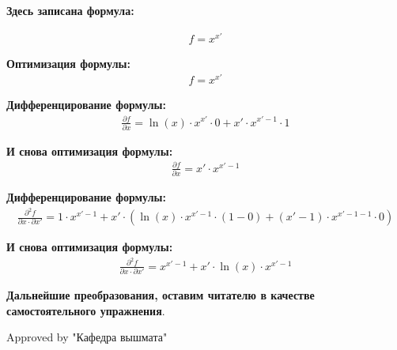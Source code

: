 \documentclass[12pt, a4paper]{article}
\begin{document}
\textbf{Здесь записана формула:}

\begin{equation}
\begin{split}
f = x ^ {x'}
\end{split}
\end{equation}

\textbf{Оптимизация формулы:}
\begin{align*}
f = x ^ {x'}\end{align*}

\textbf{Дифференцирование формулы:}
\begin{align*}
 \frac {\partial f} {\partial x}  = \ln(x) \cdot x ^ {x'} \cdot 0 + x' \cdot x ^ {x' - 1} \cdot 1\end{align*}

\textbf{И снова оптимизация формулы:}
\begin{align*}
 \frac {\partial f} {\partial x}  = x' \cdot x ^ {x' - 1}\end{align*}

\textbf{Дифференцирование формулы:}
\begin{align*}
 \frac {\partial^2 f} {\partial x \cdot \partial x'}  = 1 \cdot x ^ {x' - 1} + x'\cdot (\ln(x) \cdot x ^ {x' - 1}\cdot (1 - 0) + (x' - 1) \cdot x ^ {x' - 1 - 1} \cdot 0)\end{align*}

\textbf{И снова оптимизация формулы:}
\begin{align*}
 \frac {\partial^2 f} {\partial x \cdot \partial x'}  = x ^ {x' - 1} + x' \cdot \ln(x) \cdot x ^ {x' - 1}\end{align*}

\textbf{Дальнейшие преобразования, оставим читателю в качестве самостоятельного упражнения}.

Approved by "Кафедра вышмата"
\end{document}
